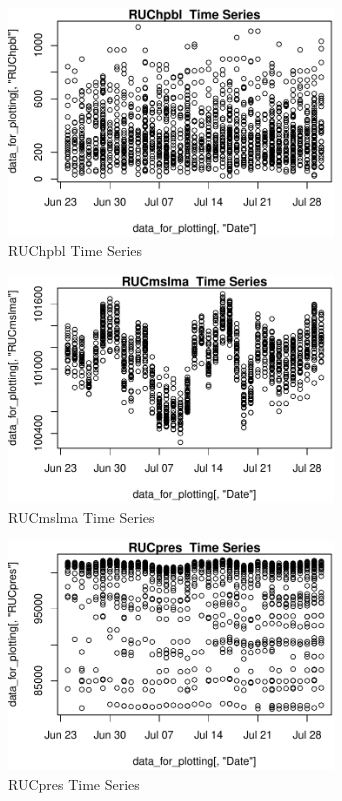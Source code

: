 \begin{figure} 
\centering  
\includegraphics[width=0.77\textwidth]{Code_Outputs/ML_input_report_AllforCaret_cleaned_StepPractice_part_practice_RUChpblTS.pdf} 
\caption{\label{fig:ML_input_report_AllforCaret_cleaned_StepPractice_part_practiceRUChpblTS}RUChpbl  Time Series} 
\end{figure} 
 

\begin{figure} 
\centering  
\includegraphics[width=0.77\textwidth]{Code_Outputs/ML_input_report_AllforCaret_cleaned_StepPractice_part_practice_RUCmslmaTS.pdf} 
\caption{\label{fig:ML_input_report_AllforCaret_cleaned_StepPractice_part_practiceRUCmslmaTS}RUCmslma  Time Series} 
\end{figure} 
 

\begin{figure} 
\centering  
\includegraphics[width=0.77\textwidth]{Code_Outputs/ML_input_report_AllforCaret_cleaned_StepPractice_part_practice_RUCpresTS.pdf} 
\caption{\label{fig:ML_input_report_AllforCaret_cleaned_StepPractice_part_practiceRUCpresTS}RUCpres  Time Series} 
\end{figure} 
 

